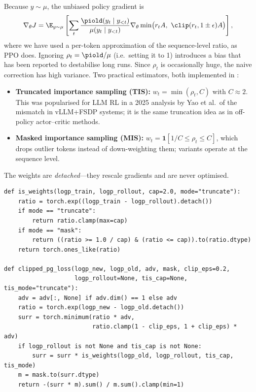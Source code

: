 Because $y\sim\mu$, the unbiased policy gradient is
\begin{equation}
\nabla_\theta J = \E_{y\sim\mu}\left[\sum_t \frac{\piold(y_t\mid y_{<t})}{\mu(y_t\mid y_{<t})}
\nabla_\theta \min\!\big(r_t A,\ \clip(r_t,1\pm\epsilon) A\big)\right],
\end{equation}
where we have used a per-token approximation of the sequence-level ratio, as PPO does.
Ignoring $\rho_t = \piold/\mu$ (i.e.\ setting it to 1) introduces a bias that has been
reported to destabilise long runs. Since $\rho_t$ is occasionally huge, the naive correction
has high variance. Two practical estimators, both implemented in
:
\begin{itemize}
\item \textbf{Truncated importance sampling (TIS):} $w_t = \min(\rho_t, C)$ with $C\approx 2$.
This was popularised for LLM RL in a 2025 analysis by Yao et al.\ of the mismatch in
vLLM+FSDP systems; it is the same truncation idea as in off-policy actor--critic methods.
\item \textbf{Masked importance sampling (MIS):} $w_t = \mathbf{1}[1/C\le\rho_t\le C]$, which
drops outlier tokens instead of down-weighting them; variants operate at the sequence level.
\end{itemize}
The weights are \emph{detached}---they rescale gradients and are never optimised.

\begin{lstlisting}[caption={Clipped surrogate with truncated importance-sampling correction.},
label={lst:rlsys:tis}]
def is_weights(logp_train, logp_rollout, cap=2.0, mode="truncate"):
    ratio = torch.exp((logp_train - logp_rollout).detach())
    if mode == "truncate":
        return ratio.clamp(max=cap)
    if mode == "mask":
        return ((ratio >= 1.0 / cap) & (ratio <= cap)).to(ratio.dtype)
    return torch.ones_like(ratio)

def clipped_pg_loss(logp_new, logp_old, adv, mask, clip_eps=0.2,
                    logp_rollout=None, tis_cap=None, tis_mode="truncate"):
    adv = adv[:, None] if adv.dim() == 1 else adv
    ratio = torch.exp(logp_new - logp_old.detach())
    surr = torch.minimum(ratio * adv,
                         ratio.clamp(1 - clip_eps, 1 + clip_eps) * adv)
    if logp_rollout is not None and tis_cap is not None:
        surr = surr * is_weights(logp_old, logp_rollout, tis_cap, tis_mode)
    m = mask.to(surr.dtype)
    return -(surr * m).sum() / m.sum().clamp(min=1)
\end{lstlisting}

